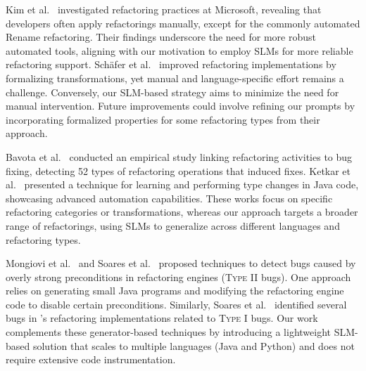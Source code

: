 Kim et al.~\cite{Kim-TSE-2014} investigated refactoring practices at Microsoft, revealing that developers often apply refactorings manually, except for the commonly automated Rename refactoring. Their findings underscore the need for more robust automated tools, aligning with our motivation to employ SLMs for more reliable refactoring support. Sch\"afer et al.~\cite{Schafer-OOPSLA-2010} improved \eclipse{} refactoring implementations by formalizing transformations, yet manual and language-specific effort remains a challenge. 
Conversely, our SLM-based strategy aims to minimize the need for manual intervention. Future improvements could involve refining our prompts by incorporating formalized properties for some refactoring types from their approach.

Bavota et al.~\cite{Bavota-scam-2012} conducted an empirical study linking refactoring activities to bug fixing, detecting 52 types of refactoring operations that induced fixes. Ketkar et al.~\cite{Ketkar-icse-12} presented a technique for learning and performing type changes in Java code, showcasing advanced automation capabilities. 
These works focus on specific refactoring categories or transformations, whereas our approach targets a broader range of refactorings, using SLMs to generalize across different languages and refactoring types.

Mongiovi et al.~\cite{Mongiovi-TSE-2018} and Soares et al.~\cite{Soares-ICSM-2011} proposed techniques to detect bugs caused by overly strong preconditions in refactoring engines (\textsc{Type II} bugs). One approach relies on generating small Java programs and modifying the refactoring engine code to disable certain preconditions. Similarly, Soares et al.~\cite{Soares-TSE-2013} identified several bugs in \eclipse{}’s refactoring implementations related to \textsc{Type I} bugs. 
Our work complements these generator-based techniques by introducing a lightweight SLM-based solution that scales to multiple languages (Java and Python) and does not require extensive code instrumentation.

